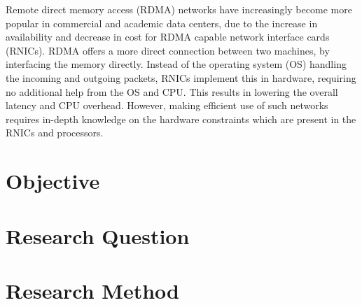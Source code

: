 Remote direct memory access (RDMA) networks have increasingly become more popular in commercial and academic data centers, due to the increase in availability and decrease in cost for RDMA capable network interface cards (RNICs).
RDMA offers a more direct connection between two machines, by interfacing the memory directly.
Instead of the operating system (OS) handling the incoming and outgoing packets, RNICs implement this in hardware, requiring no additional help from the OS and CPU. This results in lowering the overall latency and CPU overhead.
However, making efficient use of such networks requires in-depth knowledge on the hardware constraints which are present in the RNICs and processors\cite{chen2019scalable}.

\section{Objective}


\section{Research Question}

\section{Research Method}

 

